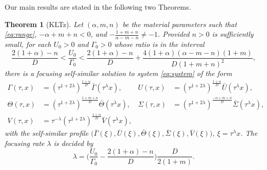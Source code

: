 \documentclass[a4paper,11pt]{article}
\def\bG{{\bar{\Gamma}}}
\def\bV{{\bar{V}}}
\def\bTh{{\bar{\Theta}}}
\def\bS{{\bar{\Sigma}}}
\def\bU{{\bar{U}}}
\newtheorem{theorem}{Theorem}
\theoremstyle{remark}
\begin{document}
Our main results are stated in the following two Theorems.
\begin{theorem}[KLTz] \label{thm1}
Let $(\alpha, m, n)$ be the material parameters such that \eqref{eq:range}, $-\alpha+m+n<0$,  and $-\frac{1+m+n}{\alpha-m-n}\ne-1$. Provided $n>0$ is sufficiently small, for each $U_0>0$ and $\Gamma_0>0$ whose ratio is in the interval
\begin{equation} \label{eq:restriction}
 \frac{2(1+\alpha) -n}{D} < \frac{U _0}{\Gamma _0} < \frac{2(1+\alpha) -n}{D} + \frac{4(1+\alpha)(\alpha-m-n)(1+m)}{D(1+m+n)^2},
\end{equation}
there is a focusing self-similar solution to system \eqref{eq:system} of the form
\begin{align*}
 \Gamma (\tau,x) &= \left(\tau^{1+ 2 \lambda}\right) ^{ \frac{1+ \alpha}{D}} \bG(\tau ^\lambda x), & U (\tau,x) &=\left(\tau^{1+ 2 \lambda}\right) ^{ \frac{1+ \alpha}{D}} \bU( \tau ^\lambda x),\\
 \Theta (\tau,x) &= \left(\tau^{1+ 2 \lambda}\right) ^{ \frac{1+ m +n}{D}} \bTh( \tau ^\lambda x), & \Sigma (\tau,x) &= \left(\tau^{1+ 2 \lambda}\right) ^{ \frac{- \alpha +m+n}{D}} \bS( \tau ^\lambda x),\\
 V (\tau,x) &= \tau ^{-\lambda} \left(\tau^{1+ 2 \lambda}\right) ^{ \frac{1+ \alpha}{D}} \bV( \tau ^\lambda x), 
\end{align*}
with the self-similar profile $\big(\bG(\xi), \bU(\xi), \bTh(\xi),\bS(\xi),\bV(\xi)\big), \ \xi = \tau^\lambda x$. The focusing rate $\lambda$ is decided by
\begin{equation} \label{eq:lambda}
 \lambda = \Big(\frac{U _0}{\Gamma _0} - \frac{2(1+\alpha)-n}{D}\Big)\frac{D}{2(1+m)}.
\end{equation}

\end{theorem}
\end{document}
